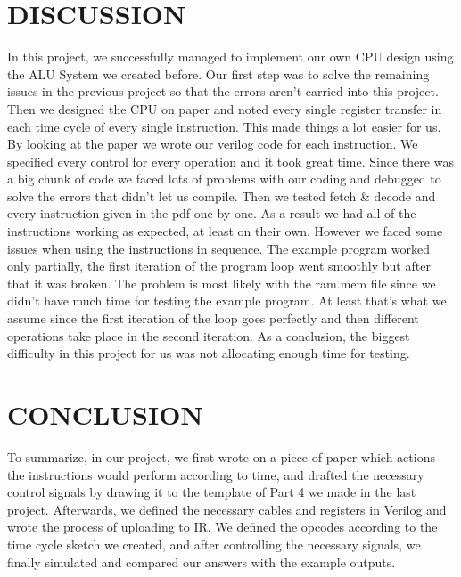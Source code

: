 \documentclass[pdftex,12pt,a4paper]{article}
\begin{document}
\section{DISCUSSION}
In this project, we successfully managed to implement our own CPU
design using the ALU System we created before. Our first step was to
solve the remaining issues in the previous project so that the errors
aren't carried into this project. Then we designed the CPU on paper and
noted every single register transfer in each time cycle of every single
instruction. This made things a lot easier for us. By looking at the
paper we wrote our verilog code for each instruction. We specified
every control for every operation and it took great time. Since
there was a big chunk of code we faced lots of problems with our
coding and debugged to solve the errors that didn't let us compile.
Then we tested fetch & decode and every instruction given in the pdf
one by one. As a result we had all of the instructions working as
expected, at least on their own. However we faced some issues when
using the instructions in sequence. The example program worked only
partially, the first iteration of the program loop went smoothly but
after that it was broken. The problem is most likely with the ram.mem
file since we didn't have much time for testing the example program.
At least that's what we assume since the first iteration of the loop
goes perfectly and then different operations take place in the second
iteration. As a conclusion, the biggest difficulty in this project for
us was not allocating enough time for testing.

\section{CONCLUSION}
To summarize, in our project, we first wrote on a piece of paper which actions the instructions would perform according to time, and drafted the necessary control signals by drawing it to the template of Part 4 we made in the last project. Afterwards, we defined the necessary cables and registers in Verilog and wrote the process of uploading to IR. We defined the opcodes according to the time cycle sketch we created, and after controlling the necessary signals, we finally simulated and compared our answers with the example outputs.

\newpage
{}



\end{document}
